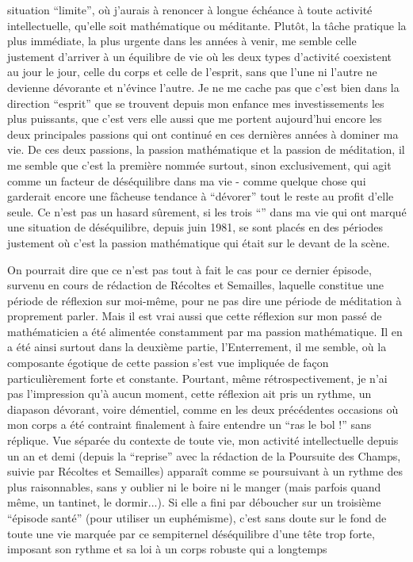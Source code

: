 situation ``limite'', où j'aurais à renoncer à longue échéance à toute activité intellectuelle, qu'elle soit mathématique ou méditante. Plutôt, la tâche pratique la plus immédiate, la plus urgente dans les années à venir, me semble celle justement d'arriver à un équilibre de vie où les deux types d'activité coexistent au jour le jour, celle du corps et celle de l'esprit, sans que l'une ni l'autre ne devienne dévorante et n'évince l'autre. Je ne me cache pas que c'est bien dans la direction ``esprit'' que se trouvent depuis mon enfance mes investissements les plus puissants, que c'est vers elle aussi que me portent aujourd'hui encore les deux principales passions qui ont continué en ces dernières années à dominer ma vie. De ces deux passions, la passion mathématique et la passion de méditation, il me semble que c'est la première nommée surtout, sinon exclusivement, qui agit comme un facteur de déséquilibre dans ma vie - comme quelque chose qui garderait encore une fâcheuse tendance à ``dévorer'' tout le reste au profit d'elle seule. Ce n'est pas un hasard sûrement, si les trois ``'' dans ma vie qui ont marqué une situation de déséquilibre, depuis juin 1981, se sont placés en des périodes justement où c'est la passion mathématique qui était sur le devant de la scène.

On pourrait dire que ce n'est pas tout à fait le cas pour ce dernier épisode, survenu en cours de rédaction de Récoltes et Semailles, laquelle constitue une période de réflexion sur moi-même, pour ne pas dire une période de méditation à proprement parler. Mais il est vrai aussi que cette réflexion sur mon passé de mathématicien a été alimentée constamment par ma passion mathématique. Il en a été ainsi surtout dans la deuxième partie, l'Enterrement, il me semble, où la composante égotique de cette passion s'est vue impliquée de façon particulièrement forte et constante. Pourtant, même rétrospectivement, je n'ai pas l'impression qu'à aucun moment, cette réflexion ait pris un rythme, un diapason dévorant, voire démentiel, comme en les deux précédentes occasions où mon corps a été contraint finalement à faire entendre un ``ras le bol !'' sans réplique. Vue séparée du contexte de toute  vie, mon activité intellectuelle depuis un an et demi (depuis la ``reprise'' avec la rédaction de la Poursuite des Champs, suivie par Récoltes et Semailles) apparaît comme se poursuivant à un rythme des plus raisonnables, sans y oublier ni le boire ni le manger (mais parfois quand même, un tantinet, le dormir...). Si elle a fini par déboucher sur un troisième ``épisode santé'' (pour utiliser un euphémisme), c'est sans doute sur le fond de toute une vie marquée par ce sempiternel déséquilibre d'une tête trop forte, imposant son rythme et sa loi à un corps robuste qui a longtemps 


